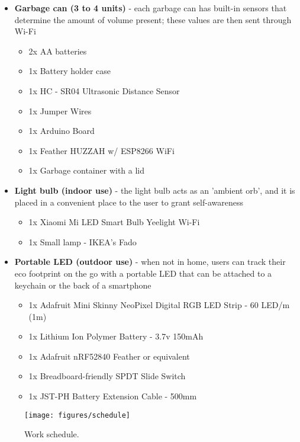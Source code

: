 \documentclass{sigchi-ext}
\begin{document}
\begin{itemize}
	\item \textbf{Garbage can (3 to 4 units)} - each garbage can has built-in sensors that determine the amount of volume present; these values are then sent through Wi-Fi
	\begin{itemize}
		\item 2x AA batteries
		\item 1x Battery holder case
		\item 1x HC - SR04 Ultrasonic Distance Sensor
		\item 1x Jumper Wires
		\item 1x Arduino Board
		\item 1x Feather HUZZAH w/ ESP8266 WiFi
		\item 1x Garbage container with a lid
	\end{itemize}
	\item \textbf{Light bulb (indoor use)} - the light bulb acts as an 'ambient orb', and it is placed in a convenient place to the user to grant self-awareness
	\begin{itemize}
		\item 1x Xiaomi Mi LED Smart Bulb Yeelight Wi-Fi
		\item 1x Small lamp - IKEA's Fado
	\end{itemize}
	\item \textbf{Portable LED (outdoor use)} - when not in home, users can track their eco footprint on the go with a portable LED that can be attached to a keychain or the back of a smartphone
	\begin{itemize}
		\item 1x Adafruit Mini Skinny NeoPixel Digital RGB LED Strip - 60 LED/m (1m)
		\item 1x Lithium Ion Polymer Battery - 3.7v 150mAh
		\item 1x Adafruit nRF52840 Feather or equivalent
		\item 1x Breadboard-friendly SPDT Slide Switch
		\item 1x JST-PH Battery Extension Cable - 500mm
	\end{itemize}
\end{itemize}

\begin{figure*}
  \centering
  \texttt{[image: figures/schedule]}
  \caption{Work schedule.}
\end{figure*}



\end{document}
